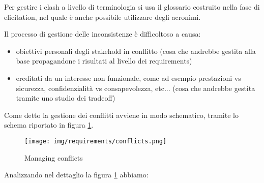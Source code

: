 Per gestire i clash a livello di terminologia si usa il glossario costruito nella
fase di elicitation, nel quale è anche possibile utilizzare degli acronimi.

Il processo di gestione delle inconsistenze è difficoltoso a causa:
\begin{itemize}
	\item obiettivi personali degli stakehold in conflitto (cosa che
	andrebbe gestita alla base propagandone i risultati al livello dei requirements)
	\item ereditati da un interesse non funzionale, come ad esempio prestazioni vs
	sicurezza, confidenzialità vs consapevolezza, etc... (cosa che andrebbe 
      gestita tramite uno studio dei tradeoff)
\end{itemize}

Come detto la gestione dei conflitti avviene in modo schematico, tramite lo
schema riportato in figura \ref{fig:conflicts}.
\begin{figure}[!ht]
    \centering
    \texttt{[image: img/requirements/conflicts.png]}
    \caption{Managing conflicts}
    \label{fig:conflicts}
\end{figure}
Analizzando nel dettaglio la figura \ref{fig:conflicts} abbiamo:
